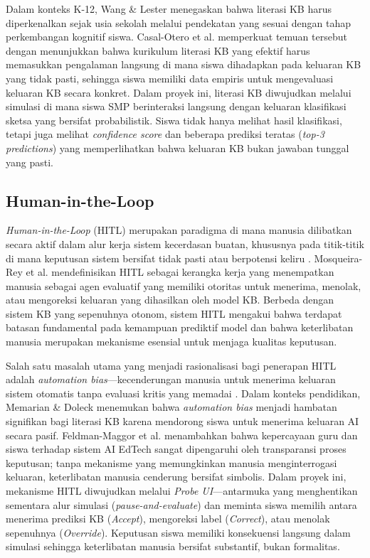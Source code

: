 \documentclass[12pt,a4paper,oneside,openany]{report}
\begin{document}
Dalam konteks K-12, Wang \& Lester \cite{ref11} menegaskan bahwa literasi KB harus diperkenalkan sejak usia sekolah melalui pendekatan yang sesuai dengan tahap perkembangan kognitif siswa. Casal-Otero et al. \cite{ref2} memperkuat temuan tersebut dengan menunjukkan bahwa kurikulum literasi KB yang efektif harus memasukkan pengalaman langsung di mana siswa dihadapkan pada keluaran KB yang tidak pasti, sehingga siswa memiliki data empiris untuk mengevaluasi keluaran KB secara konkret. Dalam proyek ini, literasi KB diwujudkan melalui simulasi di mana siswa SMP berinteraksi langsung dengan keluaran klasifikasi sketsa yang bersifat probabilistik. Siswa tidak hanya melihat hasil klasifikasi, tetapi juga melihat \textit{confidence score} dan beberapa prediksi teratas (\textit{top-3 predictions}) yang memperlihatkan bahwa keluaran KB bukan jawaban tunggal yang pasti.

\subsection{Human-in-the-Loop}
\label{subsec:hitl}

\textit{Human-in-the-Loop} (HITL) merupakan paradigma di mana manusia dilibatkan secara aktif dalam alur kerja sistem kecerdasan buatan, khususnya pada titik-titik di mana keputusan sistem bersifat tidak pasti atau berpotensi keliru \cite{ref4}. Mosqueira-Rey et al. \cite{ref4} mendefinisikan HITL sebagai kerangka kerja yang menempatkan manusia sebagai agen evaluatif yang memiliki otoritas untuk menerima, menolak, atau mengoreksi keluaran yang dihasilkan oleh model KB. Berbeda dengan sistem KB yang sepenuhnya otonom, sistem HITL mengakui bahwa terdapat batasan fundamental pada kemampuan prediktif model dan bahwa keterlibatan manusia merupakan mekanisme esensial untuk menjaga kualitas keputusan.

Salah satu masalah utama yang menjadi rasionalisasi bagi penerapan HITL adalah \textit{automation bias}---kecenderungan manusia untuk menerima keluaran sistem otomatis tanpa evaluasi kritis yang memadai \cite{ref4}. Dalam konteks pendidikan, Memarian \& Doleck \cite{ref5} menemukan bahwa \textit{automation bias} menjadi hambatan signifikan bagi literasi KB karena mendorong siswa untuk menerima keluaran AI secara pasif. Feldman-Maggor et al. \cite{ref25} menambahkan bahwa kepercayaan guru dan siswa terhadap sistem AI EdTech sangat dipengaruhi oleh transparansi proses keputusan; tanpa mekanisme yang memungkinkan manusia menginterrogasi keluaran, keterlibatan manusia cenderung bersifat simbolis. Dalam proyek ini, mekanisme HITL diwujudkan melalui \textit{Probe UI}---antarmuka yang menghentikan sementara alur simulasi (\textit{pause-and-evaluate}) dan meminta siswa memilih antara menerima prediksi KB (\textit{Accept}), mengoreksi label (\textit{Correct}), atau menolak sepenuhnya (\textit{Override}). Keputusan siswa memiliki konsekuensi langsung dalam simulasi sehingga keterlibatan manusia bersifat substantif, bukan formalitas.
\end{document}
